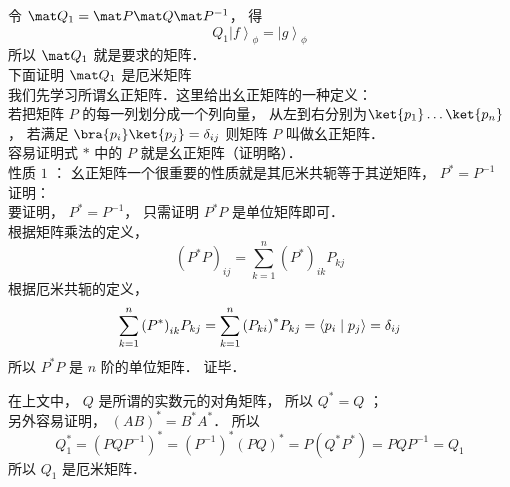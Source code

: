 令 ${\mat Q_1} = \mat P\mat Q{\mat P^{ - 1}}$，  得
\begin{equation}
  {Q_1}{\left| f \right\rangle _\phi } = {\left| g \right\rangle _\phi }
\end{equation}
所以 ${\mat Q_1}$ 就是要求的矩阵．\\
下面证明 ${\mat Q_1}$ 是厄米矩阵\\
我们先学习所谓幺正矩阵．这里给出幺正矩阵的一种定义：\\
若把矩阵 $P$ 的每一列划分成一个列向量， 从左到右分别为$\ket{p_1} \dots\ket{p_n}$，  若满足 $\bra{p_i}\ket{p_j}=\delta_{ij}$ 则矩阵 $P$ 叫做幺正矩阵．\\
容易证明式 $*$ 中的 $P$ 就是幺正矩阵（证明略）．\\
性质 $1$ ： 幺正矩阵一个很重要的性质就是其厄米共轭等于其逆矩阵， ${P^*} = {P^{ - 1}}$ \\
证明：\\
要证明， ${P^*} = {P^{ - 1}}$，  只需证明 ${P^*}P$ 是单位矩阵即可．\\
根据矩阵乘法的定义，
\begin{equation}
{\left( {{P^*}P} \right)_{ij}} = \sum\limits_{k = 1}^n {{{\left( {{P^*}} \right)}_{ik}}{P_{kj}}}
\end{equation}
根据厄米共轭的定义，
\begin{equation}
 \sum\limits_{k = 1}^n {{{\left( {{P^*}} \right)}_{ik}}{P_{kj}}}  = \sum\limits_{k = 1}^n {{{\left( {{P_{ki}}} \right)}^*}{P_{kj}}}  = \left\langle {{{p_i}}}
 \mathrel{\left | {\vphantom {{{p_i}} {{p_j}}}}
 \right. \kern-\nulldelimiterspace}
 {{{p_j}}} \right\rangle  = {\delta _{ij}}
\end{equation}
所以 ${P^*}P$ 是 $n$ 阶的单位矩阵．  证毕．

在上文中， $Q$ 是所谓的实数元的对角矩阵， 所以 ${Q^*} = Q$ ；\\
另外容易证明， ${\left( {AB} \right)^*} = {B^*}{A^*}$．  所以
\begin{equation}
Q_1^* = {\left( {PQ{P^{ - 1}}} \right)^*} = {\left( {{P^{ - 1}}} \right)^*}{\left( {PQ} \right)^*} = P\left( {{Q^*}{P^*}} \right) = PQ{P^{ - 1}} = {Q_1}
\end{equation}
所以 ${Q_1}$ 是厄米矩阵．

